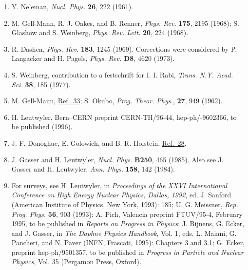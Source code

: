 \begin{enumerate}
\item {}\label{ch19-ref-34}
Y. Ne'eman, \emph{Nucl. Phys.} \textbf{26}, 222 (1961).

\item {}\label{ch19-ref-35}
M. Gell-Mann, R. J. Oakes, and B. Renner, \emph{Phys. Rev.} \textbf{175}, 2195 (1968); S. Glashow and S. Weinberg, \emph{Phys. Rev. Lett.} \textbf{20}, 224 (1968).

\item {}\label{ch19-ref-36}
R. Dashen, \emph{Phys. Rev.} \textbf{183}, 1245 (1969). Corrections were considered by P. Langacker and H. Pagels, \emph{Phys. Rev.} \textbf{D8}, 4620 (1973).

\item {}\label{ch19-ref-37}
S. Weinberg, contribution to a festschrift for I. I. Rabi, \emph{Trans. N.Y. Acad. Sci.} \textbf{38}, 185 (1977).

\item {}\label{ch19-ref-38}
M. Gell-Mann, \hyperref[ch19-ref-33]{Ref.~33}; S. Okubo, \emph{Prog. Theor. Phys.}, \textbf{27}, 949 (1962).

\item[38a.] \label{ch19-ref-38a}
H. Leutwyler, Bern--CERN preprint CERN-TH/96-44, hep-ph/-9602366, to be published (1996).

\item[38b.] \label{ch19-ref-38b}
J. F. Donoghue, E. Golowich, and B. R. Holstein, \hyperref[ch19-ref-28]{Ref.~28}.

\item {}\label{ch19-ref-39}
J. Gasser and H. Leutwyler, \emph{Nucl. Phys.} \textbf{B250}, 465 (1985). Also see J. Gasser and H. Leutwyler, \emph{Ann. Phys.} \textbf{158}, 142 (1984).

\item {}\label{ch19-ref-40}
For surveys, see H. Leutwyler, in \emph{Proceedings of the XXVI International Conference on High Energy Nuclear Physics, Dallas, 1992}, ed. J. Sanford (American Institute of Physics, New York, 1993): 185; U. G. Meissner, \emph{Rep. Prog. Phys.} \textbf{56}, 903 (1993); A. Pich, Valencia preprint FTUV/95-4, February 1995, to be published in \emph{Reports on Progress in Physics}; J. Bijnens, G. Ecker, and J. Gasser, in \emph{The Daphne Physics Handbook}, Vol. 1, eds. L. Maiani, G. Pancheri, and N. Paver (INFN, Frascati, 1995): Chapters 3 and 3.1; G. Ecker, preprint hep-ph/9501357, to be published in \emph{Progress in Particle and Nuclear Physics}, Vol. 35 (Pergamon Press, Oxford).


\end{enumerate}
